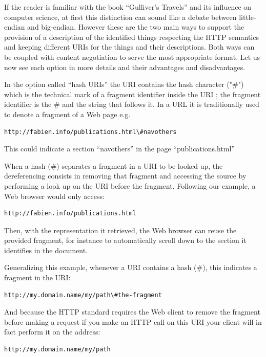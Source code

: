 If the reader is familiar with the book ``Gulliver's Travels'' and its
influence on computer science, at first this distinction can sound like
a debate between little-endian and big-endian. However these are the two
main ways to support the provision of a description of the identified
things respecting the HTTP semantics and keeping different URIs for the
things and their descriptions. Both ways can be coupled with content
negotiation to serve the most appropriate format. Let us now see each
option in more details and their advantages and disadvantages.

In the option called ``hash URIs'' the URI contains the hash character
("\#") which is the technical mark of a fragment identifier inside the
URI ; the fragment identifier is the \# and the string that follows it.
In a URL it is traditionally used to denote a fragment of a Web page
e.g.

\begin{lstlisting}
http://fabien.info/publications.html\#navothers
\end{lstlisting}

This could indicate a section ``navothers'' in the page
``publications.html''

When a hash (\#) separates a fragment in a URI to be looked up, the
dereferencing consists in removing that fragment and accessing the
source by performing a look up on the URI before the fragment. Following
our example, a Web browser would only access:

\begin{lstlisting}
http://fabien.info/publications.html
\end{lstlisting}

Then, with the representation it retrieved, the Web browser can reuse
the provided fragment, for instance to automatically scroll down to the
section it identifies in the document.

Generalizing this example, whenever a URI contains a hash (\#), this
indicates a fragment in the URI:

\begin{lstlisting}
http://my.domain.name/my/path\#the-fragment
\end{lstlisting}


And because the HTTP standard requires the Web client to remove the
fragment before making a request if you make an HTTP call on this URI
your client will in fact perform it on the address:

\begin{lstlisting}
http://my.domain.name/my/path
\end{lstlisting}


